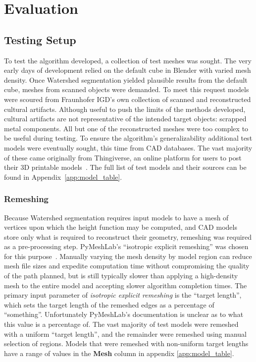 \chapter{Evaluation}\label{sec:eval}
\section{Testing Setup}
To test the algorithm developed, a collection of test meshes was sought.
The very early days of development relied on the default cube in Blender with varied mesh density.
Once Watershed segmentation yielded plausible results from the default cube, meshes from scanned objects were demanded.
To meet this request models were scoured from Fraunhofer IGD's own collection of scanned and reconstructed cultural artifacts.
Although useful to push the limits of the methods developed, cultural artifacts are not representative of the intended target objects: scrapped metal components.
All but one of the reconstructed meshes were too complex to be useful during testing.
To ensure the algorithm's generalizability additional test models were eventually sought, this time from CAD databases.
The vast majority of these came originally from Thingiverse, an online platform for users to post their 3D printable models~\cite{Thingiverse}.
The full list of test models and their sources can be found in Appendix~\ref{app:model_table}.

\subsection{Remeshing}
Because Watershed segmentation requires input models to have a mesh of vertices upon which the height function may be computed, and CAD models store only what is required to reconstruct their geometry, remeshing was required as a pre-processing step.
PyMeshLab's ``isotropic explicit remeshing'' was chosen for this purpose~\cite{PyMeshLab}.
Manually varying the mesh density by model region can reduce mesh file sizes and expedite computation time without compromising the quality of the path planned, but is still typically slower than applying a high-density mesh to the entire model and accepting slower algorithm completion times.
The primary input parameter of \textit{isotropic explicit remeshing} is the ``target length'', which sets the target length of the remeshed edges as a percentage of ``something''.
Unfortunately PyMeshLab's documentation is unclear as to what this value is a percentage of.
The vast majority of test models were remeshed with a uniform ``target length'', and the remainder were remeshed using manual selection of regions.
Models that were remeshed with non-uniform target lengths have a range of values in the \textbf{Mesh} column in appendix \ref{app:model_table}.

